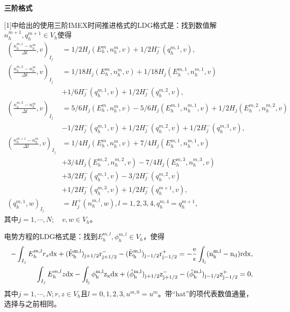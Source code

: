 \documentclass[lang=cn,newtx,10pt,scheme=chinese]{elegantbook}
\begin{document}
\noindent \bf{三阶格式}

[1]中给出的使用三阶IMEX时间推进格式的LDG格式是：找到数值解$n_h^{m+1},q_h^{m+1} \in V_h$使得
\begin{align}
    (\frac{n_h^{m,1} -n_h^m}{\Delta t},v)_{I_j} & =1/2 H_j(E_h^m,n_h^m,v) + 1/2 H_j^-(q_h^{m,1},v),           \label{weakForm:IMEX3 LDG 1}           \\
    (\frac{n_h^{m,2} -n_h^m}{\Delta t},v)_{I_j} & = 1/18 H_j(E_h^m,n_h^m,v) + 1/18 H_j(E_h^{m,1},n_h^{m,1},v) \nonumber                              \\
                                                & + 1/6 H_j^-(q_h^{m,1},v) + 1/2 H_j^-(q_h^{m,2},v),                                                 \\
    (\frac{n_h^{m,3} -n_h^m}{\Delta t},v)_{I_j} & =5/6 H_j(E_h^m,n_h^m,v) -5/6 H_j(E_h^{m,1},n_h^{m,1},v) + 1/2 H_j(E_h^{m,2},n_h^{m,2},v) \nonumber \\
                                                & - 1/2 H_j^-(q_h^{m,1},v) + 1/2 H_j^-(q_h^{m,2},v) + 1/2 H_j^-(q_h^{m,3},v),                        \\
    (\frac{n_h^{m+1} -n_h^m}{\Delta t},v)_{I_j} & = 1/4 H_j(E_h^m,n_h^m,v) +7/4 H_j(E_h^{m,1},n_h^{m,1},v)  \nonumber                                \\
                                                & + 3/4 H_j(E_h^{m,2},n_h^{m,2},v) - 7/4 H_j(E_h^{m,3},n_h^{m,3},v) \nonumber                        \\
                                                & +3/2 H_j^-(q_h^{m,1},v) -3/2 H_j^-(q_h^{m,2},v) \nonumber                                          \\
                                                & + 1/2 H_j^-(q_h^{m,3},v)  + 1/2 H_j^-(q_h^{m+1},v),                                                \\
    (q_h^{m,1},w)_{I_j}                         & = H_j^+(n_h^{m,l},w), l = 1,2,3,4, q_h^{m,4} = q_h^{m+1},
\end{align}
其中$j = 1,\cdots,N;\quad v,w \in V_h$。

电势方程的LDG格式是：找到$E_h^{m,l},\phi_h^{m,l} \in V_h$，使得
\begin{align}
    -\int_{I_j} E_h^{m,l}r_x \rm{d}x + (\hat{E}_h^{m,l})_{j+1/2}r_{j+1/2}^- - (\hat{E}_h^{m,l})_{j-1/2}r_{j-1/2}^+ = -\frac{e}{\epsilon}\int_{I_j}(n_h^{m,l} - n_d) r\rm{d} x, \\
    \int_{I_j} E_h^{m,l}z \rm{d}x - \int_{I_j} \phi_h^{m,l}z_x \rm{d}x  + (\hat{\phi}_h^{m,l})_{j+1/2}z^-_{j+1/2} - (\hat{\phi}_h^{m,l})_{j-1/2}z_{j-1/2}^+  = 0,\label{equation:IMEX3 LDG:EPE 2}
\end{align}
其中$j = 1,\cdots,N; r,z \in V_h$且$l = 0,1,2,3, u^{m,0} = u^m$。带“hat”的项代表数值通量，选择与之前相同。
\end{document}
